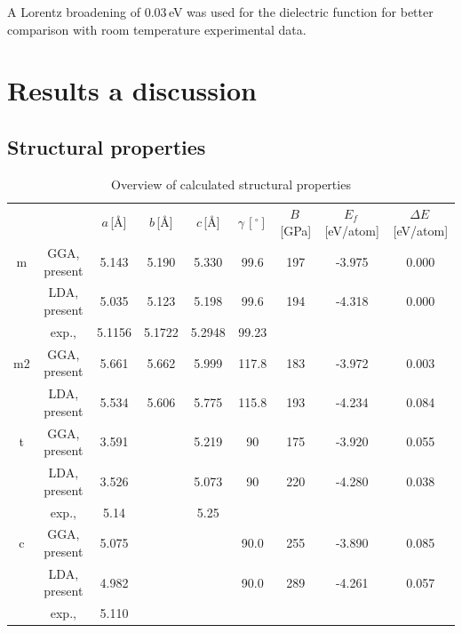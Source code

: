 \documentclass[10pt,a4paper,twocolumn]{article}
\begin{document}
A Lorentz broadening of 0.03\,eV was used for the dielectric function for better comparison with room temperature experimental data.

\section{Results a discussion}

\subsection{Structural properties}

\begin{table}
\begin{center}
\begin{tabular}{ccccccccc}

 & & $a$\,[\AA] & $b$\,[\AA] & $c$\,[\AA] & $\gamma\,[^{\circ}]$ &
$B$\,[GPa] & $E_f$\,[eV/atom] & $\Delta E$\,[eV/atom]\\
m & GGA, present & 5.143 & 5.190 & 5.330 & 99.6 & 197 & -3.975 & 0.000
\\%
  & LDA, present & 5.035 & 5.123 & 5.198 & 99.6 & 194 & -4.318 & 0.000
\\%
  & exp., \citet{Adam1959} & 5.1156 & 5.1722 & 5.2948 & 99.23 & & & \\

m2 & GGA, present & 5.661 & 5.662 & 5.999 & 117.8 & 183 & -3.972 &
0.003\\ %
   & LDA, present & 5.534 & 5.606 & 5.775 & 115.8 & 193 & -4.234 &
0.084\\ %

t & GGA, present & 3.591 & & 5.219 & 90 & 175 & -3.920 & 0.055\\ %
  & LDA, present & 3.526 & & 5.073 & 90 & 220 & -4.280 & 0.038\\ %
  & exp., \citet{Curtis1954} & 5.14 & & 5.25 & & & & \\

c & GGA, present & 5.075 & & & 90.0 & 255 & -3.890 & 0.085 \\%
  & LDA, present & 4.982 & & & 90.0 & 289 & -4.261 & 0.057 \\%
  & exp., \citet{Senft1983} & 5.110 & & & & & & \\

\end{tabular}
\caption{Overview of calculated structural properties}
\label{structure}
\end{center}
\end{table}
\end{document}
